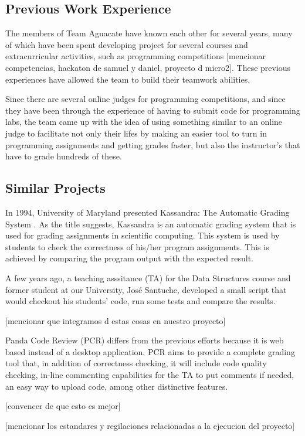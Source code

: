 
\subsection{Previous Work Experience}
The members of Team Aguacate have known each other for several years, many of which have been spent developing project for several courses and extracurricular activities, such as programming competitions [mencionar competencias, hackaton de samuel y daniel, proyecto d micro2].  These previous experiences have allowed the team to build their teamwork abilities.

Since there are several online judges for programming competitions, and since they have been through the experience of having to submit code for programming labs, the team came up with the idea of using something similar to an online judge to facilitate not only their lifes by making an easier tool to turn in programming assignments and getting grades faster, but also the instructor's that have to grade hundreds of these.

\subsection{Similar Projects}

In 1994, University of Maryland presented Kassandra: The Automatic Grading System \cite{Matt1994}.  As the title suggests, Kassandra is an automatic grading system that is used for grading assignments in scientific computing.  This system is used by students to check the correctness of his/her program assignments.  This is achieved by comparing the program output with the expected result.

A few years ago, a teaching asssitance (TA) for the Data Structures course and former student at our University, José Santuche, developed a small script that would checkout his students' code, run some tests and compare the results.

[mencionar que integramos d estas cosas en nuestro proyecto]

Panda Code Review (PCR) differs from the previous efforts because it is web based instead of a desktop application. PCR aims to provide a complete grading tool that, in addition of correctness checking, it will include code quality checking, in-line commenting capabilities for the TA to put comments if needed, an easy way to upload code, among other distinctive features.

[convencer de que esto es mejor]

[mencionar los estandares y regilaciones relacionadas a la ejecucion del proyecto]